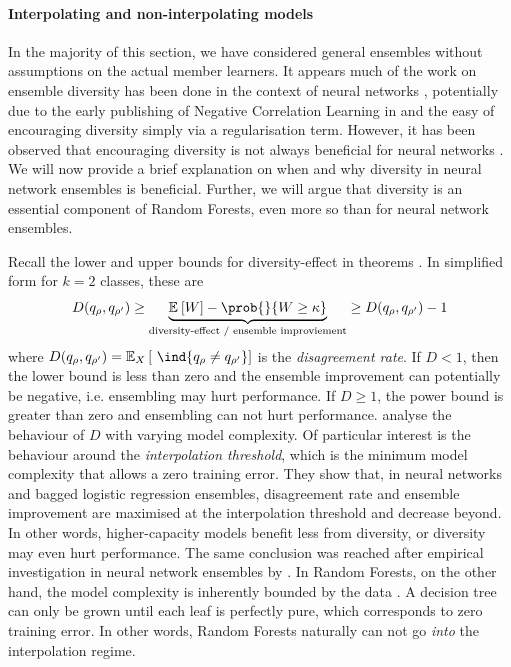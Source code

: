 \documentclass[
	twoside=false, %
]{kaobook}
\begin{document}
\paragraph{Interpolating and non-interpolating models} 

In the majority of this section, we have considered general ensembles without assumptions on the actual member learners. It appears much of the work on ensemble diversity has been done in the context of neural networks
\cite{
diversity-nns
}
, potentially due to the early publishing of Negative Correlation Learning \cite{liu_EnsembleLearningNegative_1999} in \citeyear{liu_EnsembleLearningNegative_1999} and the easy of encouraging diversity simply via a regularisation term. 
However, it has been observed that encouraging diversity is not always beneficial for neural networks
\cite{
adnan_ComplementRandomForest_2015
liu_EnsembleLearningNegative_1999,
li_NeuralNetworkEnsembles_2021
}. 
We will now provide a brief explanation on when and why diversity in neural network ensembles is beneficial. Further, we will argue that diversity is an essential component of Random Forests, even more so than for neural network ensembles.

Recall the lower and upper bounds for diversity-effect in theorems \cite{thm:theisen-lower, thm:theisen-upper}. In simplified form for $k=2$ classes, these are
$$
D(q_{\rho}, q_{\rho'}) \geq 
\underbrace{
\mathbb{E}_{}\left[ W \right]  - \prob{}{W \geq \kappa} 
}_{\text{diversity-effect / ensemble improviement} }
\geq D(q_{\rho}, q_{\rho'}) - 1
$$
where $D(q_{\rho}, q_{\rho'}) = \mathbb{E}_{X}\left[ ~\ind{q_{\rho} \not= q_{\rho'}} \right]$ is the \textit{disagreement rate}. If $D < 1$, then the lower bound is less than zero and the ensemble improvement can potentially be negative, i.e. ensembling may hurt performance. If $D \geq 1$, the power bound is greater than zero and ensembling can not hurt performance. \citeauthor{theisen} analyse the behaviour of $D$ with varying model complexity. Of particular interest is the behaviour around the \textit{interpolation threshold}, which is the minimum model complexity that allows a zero training error. They show that, in neural networks and bagged logistic regression ensembles, disagreement rate and ensemble improvement are maximised at the interpolation threshold and decrease beyond. In other words, higher-capacity models benefit less from diversity, or diversity may even hurt performance. The same conclusion was reached after empirical investigation in neural network ensembles by \citeauthor{abe} \cite{abe}.
In Random Forests, on the other hand, the model complexity is inherently bounded by the data \cite{buschj}. A decision tree can only be grown until each leaf is perfectly pure, which corresponds to zero training error. In other words, Random Forests naturally can not go \textit{into} the interpolation regime.
\end{document}
